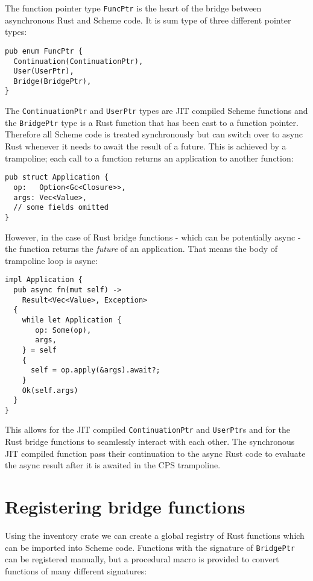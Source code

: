 \documentclass[sigplan,review,anonymous]{acmart}
\begin{document}
The function pointer type \texttt{FuncPtr} is the heart of the bridge between
asynchronous Rust and Scheme code. It is sum type of three different pointer
types:

\begin{verbatim}
pub enum FuncPtr {
  Continuation(ContinuationPtr),
  User(UserPtr),
  Bridge(BridgePtr),
}
\end{verbatim}

The \texttt{ContinuationPtr} and \texttt{UserPtr} types are JIT compiled
Scheme functions and the \texttt{BridgePtr} type is a Rust function that has
been cast to a function pointer. Therefore all Scheme code is treated
synchronously but can switch over to async Rust whenever it needs to await the
result of a future. This is achieved by a trampoline; each call to a function
returns an application to another function:

\begin{verbatim}
pub struct Application {
  op:   Option<Gc<Closure>>,
  args: Vec<Value>,
  // some fields omitted 
}
\end{verbatim}

However, in the case of Rust bridge functions - which can be potentially async -
the function returns the \textit{future} of an application. That means the body of
trampoline loop is async:

\begin{verbatim}
impl Application {
  pub async fn(mut self) ->
    Result<Vec<Value>, Exception>
  {
    while let Application {
       op: Some(op),
       args,
    } = self
    {
      self = op.apply(&args).await?;
    }
    Ok(self.args)
  }
}
\end{verbatim}

This allows for the JIT compiled \texttt{ContinuationPtr} and
\texttt{UserPtr}s and for the Rust bridge functions to seamlessly interact
with each other. The synchronous JIT compiled function pass their continuation
to the async Rust code to evaluate the async result after it is awaited in the
CPS trampoline.

\section{Registering bridge functions}

Using the inventory\cite{inventory} crate we can create a global registry of Rust
functions which can be imported into Scheme code. Functions with the signature of
\texttt{BridgePtr} can be registered manually, but a procedural macro is provided
to convert functions of many different signatures:
\end{document}
